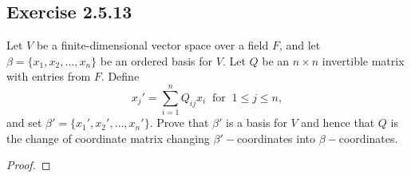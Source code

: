 \subsection*{Exercise 2.5.13} Let \( V  \) be a finite-dimensional vector space over a field \( F  \), and let \( \beta = \{ {x}_{1}, {x}_{2}, \dots, {x}_{n} \}  \) be an ordered basis for \( V  \). Let \( Q  \) be an \( n \times n \) invertible matrix with entries from \( F  \). Define 
\[  {x}_{j}' = \sum_{ i=1  }^{ n  } {Q}_{ij} {x}_{i} \ \text{ for } \ 1 \leq j \leq n, \]
and set \( \beta' = \{ {x}_{1}', {x}_{2}', \dots, {x}_{n}' \}  \). Prove that \( \beta'  \) is a basis for \( V  \) and hence that \( Q  \) is the change of coordinate matrix changing \( \beta'-  \)coordinates into \( \beta- \)coordinates.
\begin{proof}

\end{proof}
